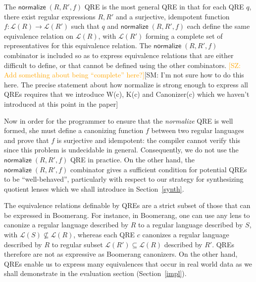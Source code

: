 \documentclass[acmsmall,review,anonymous]{acmart}
\newcommand{\FINISH}[3]{\ifdraft\textcolor{#1}{[#2: #3]}\fi}
\newcommand{\saz}[1]{\FINISH{orange}{SZ}{#1}}
\newcommand{\sam}[1]{\FINISH{dkpurple}{SM}{#1}}
\newcommand{\kw}[1]{\ensuremath{\mathsf{#1}}}
\newcommand{\normalize}[3]{\ensuremath{\kw{normalize} \; (#1, #2, #3)}}
\begin{document}
The $\normalize{R}{R'}{f}$ QRE is the most general QRE in that for each QRE
$q$, there exist regular expressions $R, R'$ and a surjective, idempotent
function $f:\mathcal{L}(R) \longrightarrow \mathcal{L}(R')$ such that $q$ and
$\normalize{R}{R'}{f}$ each define the same equivalence relation on
$\mathcal{L}(R)$, with $\mathcal{L}(R')$ forming a complete set of
representatives for this equivalence relation. The $\normalize{R}{R'}{f}$
combinator is included so as to express equivalence relations that are either
difficult to define, or that cannot be defined using the other combinators.
\saz{Add something about being ``complete'' here?}\sam{I'm not sure how to do
this here. The precise statement about how normalize is strong enough to
express all QREs requires that we introduce W(c), K(c) and Canonizer(c) which
we haven't introduced at this point in the paper}

Now in order for the programmer to ensure that the {\em normalize} QRE is well
formed, she must define a canonizing function $f$ between two regular
languages and prove that $f$ is surjective and idempotent: the compiler cannot
verify this since this problem is undecidable in general. Consequently, we do
not use the $\normalize{R}{R'}{f}$ QRE in practice. On the other hand, the
$\normalize{R}{R'}{f}$ combinator gives a sufficient condition for potential
QREs to be ``well-behaved'', particularly with respect to our strategy for
synthesizing quotient lenses which we shall introduce in Section~\ref{synth}.

The equivalence relations definable by QREs are a strict subset of those that
can be expressed in Boomerang. For instance, in Boomerang, one can use any lens
to canonize a regular language described by $R$ to a regular language described
by $S$, with $\mathcal{L}(S) \not \subseteq \mathcal{L}(R)$, whereas each QRE
$c$ canonizes a regular language described by $R$ to regular subset
$\mathcal{L}(R') \subseteq \mathcal{L}(R)$ described by $R'$. QREs therefore are
not as expressive as Boomerang canonizers. On the other hand, QREs enable us to
express many equivalences that occur in real world data as we shall demonstrate
in the evaluation section (Section~\ref{impl}).
\end{document}
